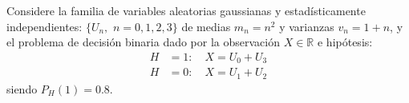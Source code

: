 \ifspanish

\question Considere la familia de variables aleatorias gaussianas y estadísticamente independientes:
$\{U_n, \,\,n=0,1,2, 3\}$ 
de medias $m_n = n^2$ y varianzas $v_n = 1+n$, y el problema de decisión binaria dado por la observación $X \in \mathbb{R}$ e hipótesis:
\begin{align*}
    H &=1: \quad X = U_0 + U_3  \\
    H &=0: \quad X = U_1 + U_2
\end{align*}
siendo $P_H(1) = 0.8$.

